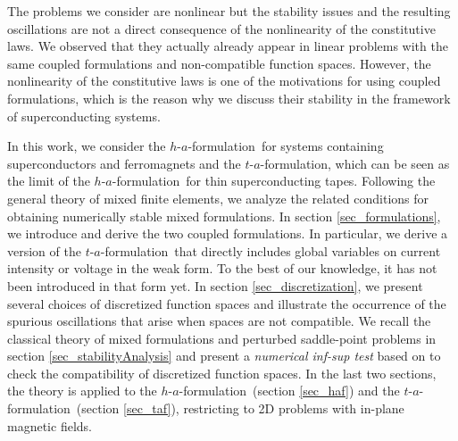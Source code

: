 \documentclass[journal]{IEEEtran}
\newcommand{\haf}{$h$-$a$-formulation\ }
\newcommand{\taf}{$t$-$a$-formulation\ }
\newcommand{\tafOnly}{$t$-$a$-formulation}
\begin{document}
The problems we consider are nonlinear but the stability issues and the resulting
oscillations are not a direct consequence of the nonlinearity of the
constitutive laws. We observed that they actually already appear in linear problems
with the same coupled formulations and non-compatible function
spaces. %
However, the nonlinearity of the constitutive
laws is one of the motivations for using coupled
formulations, which is the reason why we discuss their stability in the framework of superconducting systems.

In this work, we consider the \haf for systems
containing superconductors and ferromagnets and the \tafOnly, which can be seen as the limit of the \haf for thin superconducting tapes. Following the general theory of mixed finite
elements, we analyze the related conditions for obtaining numerically
stable mixed formulations. In section \ref{sec_formulations}, we
introduce and derive the two coupled formulations. In particular, we derive a
version of the \taf that directly includes global variables on current
intensity or voltage in the weak form. To the best of our knowledge, it
has not been introduced in that form yet. In section
\ref{sec_discretization}, we present several choices of discretized
function spaces and illustrate the occurrence of the spurious
oscillations that arise when spaces are not compatible. We
recall the classical theory of mixed formulations and perturbed
saddle-point problems \cite{brezziBook} in section
\ref{sec_stabilityAnalysis} and present a \textit{numerical inf-sup
test} based on \cite{bathe2001inf} to check the compatibility of discretized function spaces.
In the last two sections, the theory is applied to the \haf (section
\ref{sec_haf}) and the \taf (section \ref{sec_taf}), restricting to 2D problems with in-plane magnetic fields. 




\end{document}
